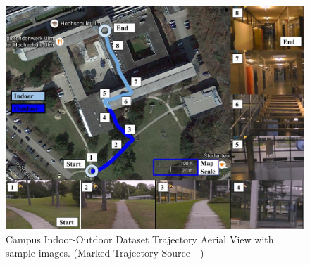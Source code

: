 \documentclass[letterpaper, 10 pt, conference]{ieeeconf}  %
\begin{document}
\begin{figure}[h]
\centering
 \includegraphics[scale=0.23]{campus-datasetTrajSampleImages}
 \caption{Campus Indoor-Outdoor Dataset Trajectory Aerial View with sample images. (Marked Trajectory Source - \cite{ctaTrajGMap})}
 \label{fig:campusTraj}
\end{figure}
\end{document}
